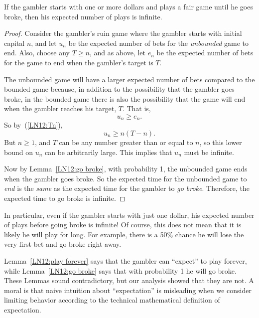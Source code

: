 \begin{editingnotes}
\begin{lemma}\label{LN12:play forever}
If the gambler starts with one or more dollars and plays a fair game until
he goes broke, then his expected number of plays is infinite.
\end{lemma}

\begin{proof}
Consider the gambler's ruin game where the gambler starts with initial
capital $n$, and let $u_n$ be the expected number of bets for
the \emph{unbounded} game to end.  Also, choose any $T \geq n$, and as
above, let $e_n$ be the expected number of bets for the game to end when
the gambler's target is $T$.

The unbounded game will have a larger expected number of bets compared to
the bounded game because, in addition to the possibility that the gambler
goes broke, in the bounded game there is also the possibility that the
game will end when the gambler reaches his target, $T$.  That is,
\[
u_n \geq e_n.
\]
So by~(\ref{LN12:Tn}), 
\[
u_n \geq n(T-n).
\]
But $n \geq 1$, and $T$ can be any number greater than or equal to $n$, so
this lower bound on $u_n$ can be arbitrarily large.  This implies that
$u_n$ must be infinite.

Now by Lemma~\ref{LN12:go broke}, with probability 1, the unbounded game ends
when the gambler goes broke.  So the expected time for the unbounded game
to \emph{end} is the \emph{same} as the expected time for the gambler to
\emph{go broke}.  Therefore, the expected time to go broke is infinite.
\end{proof}

In particular, even if the gambler starts with just one dollar, his
expected number of plays before going broke is infinite!  Of course, this
does not mean that it is likely he will play for long.  For example, there
is a 50\% chance he will lose the very first bet and go broke right away.

Lemma~\ref{LN12:play forever} says that the gambler can ``expect'' to play
forever, while Lemma~\ref{LN12:go broke} says that with probability 1 he will
go broke.  These Lemmas sound contradictory, but our analysis showed that
they are not.  A moral is that naive intuition about ``expectation'' is
misleading when we consider limiting behavior according to the technical
mathematical definition of expectation.

\end{editingnotes}


